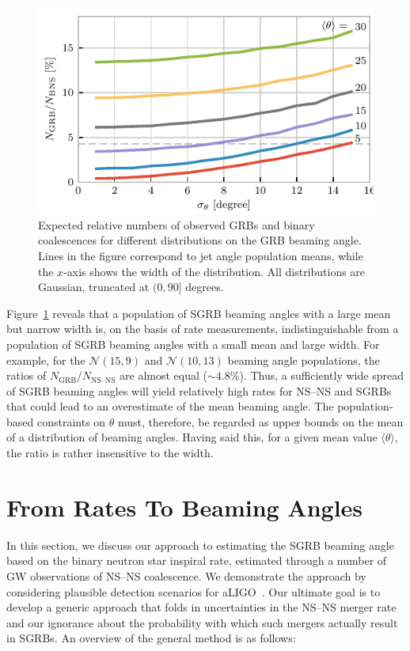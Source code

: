 \documentclass[twocolumn]{aastex61}
\newcommand{\BNS}{\ac{NS}--\ac{NS}\xspace}
\begin{document}
\begin{figure}
\centering
\includegraphics[width=\linewidth]{color_relativenumber.pdf}
\caption{\label{fig:thetapopulation} Expected relative numbers of
  observed GRBs and binary coalescences for different distributions on
  the GRB beaming angle.  Lines in the figure correspond to jet angle
  population means, while the $x$-axis shows the width of the
  distribution.  All distributions are Gaussian, truncated at
  $(0, 90]$ degrees.\label{fig:thetapop}}
\end{figure}




Figure~\ref{fig:thetapop} reveals that a population of \ac{SGRB} beaming angles with a large mean but narrow width is, on the basis of rate measurements, indistinguishable from a population of \ac{SGRB} beaming angles with a small mean and large width.
For example, for the ${\mathcal N}(15,9)$ and ${\mathcal N}(10,13)$ beaming angle populations, the ratios of $N_{\mathrm{GRB}}/N_{\text{NS--NS}}$ are almost equal ($\sim 4.8\%$).
Thus, a sufficiently wide spread of \ac{SGRB} beaming angles will yield relatively high rates for \BNS and \acp{SGRB} that could lead to an overestimate of the mean beaming angle.
The population-based constraints on $\theta$ must, therefore, be regarded as upper bounds on the mean of a distribution of beaming angles.
Having said this, for a given mean value $\langle \theta \rangle$, the ratio is rather insensitive to the width.


\section{From Rates To Beaming Angles}

In this section, we discuss our approach to estimating the \ac{SGRB} beaming angle based on the binary neutron star inspiral rate, estimated through a number of \ac{GW} observations of \BNS coalescence.
We demonstrate the approach by considering plausible detection scenarios for \ac{aLIGO}~\cite{Aasi:2013wya}.
Our ultimate goal is to develop a generic approach that folds in uncertainties in the \BNS merger rate and our ignorance about the probability with which such mergers actually result in \acp{SGRB}.
%
An overview of the general method is as follows:
\end{document}
